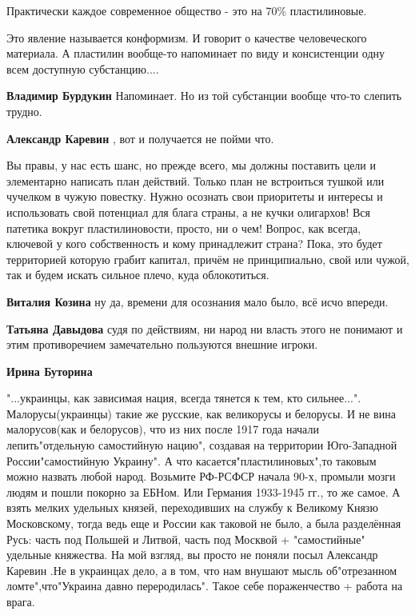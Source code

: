 \begin{itemize}
\begin{itemize}
\end{itemize} %

Практически каждое современное общество - это на 70\% пластилиновые.


Это явление называется конформизм. И говорит о качестве человеческого
материала. А пластилин вообще-то напоминает по виду и консистенции одну всем
доступную субстанцию....

\begin{itemize} %
\textbf{Владимир Бурдукин} Напоминает. Но из той субстанции вообще что-то слепить трудно.

\textbf{Александр Каревин} , вот и получается не пойми что.
\end{itemize} %


Вы правы, у нас есть шанс, но прежде всего, мы должны поставить цели и
элементарно написать план действий. Только план не встроиться тушкой или
чучелком в чужую повестку. Нужно осознать свои приоритеты и интересы и
использовать свой потенциал для блага страны, а не кучки олигархов! Вся
патетика вокруг пластилиновости, просто, ни о чем! Вопрос, как всегда, ключевой
у кого собственность и кому принадлежит страна? Пока, это будет территорией
которую грабит капитал, причём не принципиально, свой или чужой, так и будем
искать сильное плечо, куда облокотиться.

\begin{itemize} %
\textbf{Виталия Козина} ну да, времени для осознания мало было, всё исчо впереди.

\textbf{Татьяна Давыдова} судя по действиям, ни народ ни власть этого не понимают и этим противоречием замечательно пользуются внешние игроки.
\end{itemize} %

\textbf{Ирина Буторина} 

"...украинцы, как зависимая нация, всегда тянется к тем, кто
сильнее...". Малорусы(украинцы) такие же русские, как великорусы и белорусы. И не
вина малорусов(как и белорусов), что из них после 1917 года начали
лепить"отдельную самостийную нацию", создавая на территории Юго-Западной
России"самостийную Украину". А что касается"пластилиновых",то таковым можно
назвать любой народ. Возьмите РФ-РСФСР начала 90-х, промыли мозги людям и пошли
покорно за ЕБНом. Или Германия 1933-1945 гг., то же самое. А взять мелких удельных
князей, переходивших на службу к Великому Князю Московскому, тогда ведь еще и
России как таковой не было, а была разделённая Русь: часть под Польшей и
Литвой, часть под Москвой + "самостийные" удельные княжества. На мой взгляд, вы
просто не поняли посыл Александр Каревин .Не в украинцах дело, а в том, что нам
внушают мысль об"отрезанном ломте",что"Украина давно переродилась". Такое себе
пораженчество + работа на врага.


\end{itemize}
